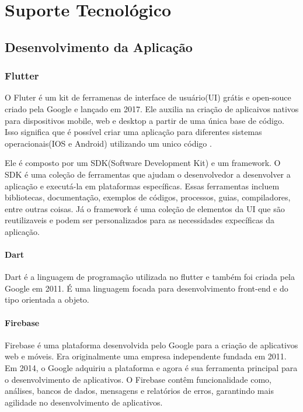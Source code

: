 \chapter[Suporte Tecnológico]{Suporte Tecnológico}

\section{Desenvolvimento da Aplicação}

\subsection{Flutter}

O Fluter é um kit de ferramenas de interface de usuário(UI) grátis e open-souce criado pela Google e lançado em 2017. Ele auxilia na criação de aplicaivos nativos para dispositivos mobile, web e desktop a partir de uma única base de código. Isso significa que é possível criar uma aplicação para diferentes sistemas operacionais(IOS e Android) utilizando um unico código \cite{flutter2017}.

Ele é composto por um SDK(Software Development Kit) e um framework. O SDK é uma coleção de ferramentas que ajudam o desenvolvedor a desenvolver a aplicação e executá-la em plataformas específicas. Essas ferramentas incluem bibliotecas, documentação, exemplos de códigos, processos, guias, compiladores, entre outras coisas. Já o framework é uma coleção de elementos da UI que são reutilizaveis e podem ser personalizados para as necessidades expecíficas da aplicação\cite{flutter2017}.

\subsubsection{Dart}

Dart é a linguagem de programação utilizada no flutter e também foi criada pela Google em 2011. É uma linguagem focada para desenvolvimento front-end e do tipo orientada a objeto\cite{flutter2017}.

\subsubsection{Firebase}

Firebase é uma plataforma desenvolvida pelo Google para a criação de aplicativos web e móveis. Era originalmente uma empresa independente fundada em 2011. Em 2014, o Google adquiriu a plataforma e agora é sua ferramenta principal para o desenvolvimento de aplicativos. O Firebase contêm funcionalidade como, análises, bancos de dados, mensagens e relatórios de erros, garantindo mais agilidade no desenvolvimento de aplicativos\cite{firebase2011}.

